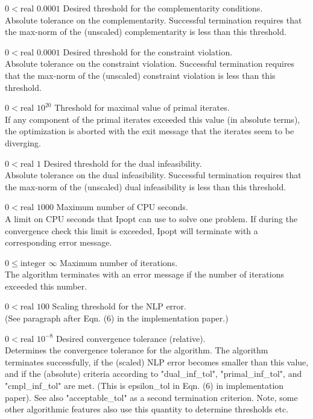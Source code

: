 %
{$0<\textrm{real}$}%
{$0.0001$}%
{Desired threshold for the complementarity conditions.\\
Absolute tolerance on the complementarity. Successful termination requires that the max-norm of the (unscaled) complementarity is less than this threshold.}%
{}

%
{$0<\textrm{real}$}%
{$0.0001$}%
{Desired threshold for the constraint violation.\\
Absolute tolerance on the constraint violation. Successful termination requires that the max-norm of the (unscaled) constraint violation is less than this threshold.}%
{}

%
{$0<\textrm{real}$}%
{$10^{ 20}$}%
{Threshold for maximal value of primal iterates.\\
If any component of the primal iterates exceeded this value (in absolute terms), the optimization is aborted with the exit message that the iterates seem to be diverging.}%
{}

%
{$0<\textrm{real}$}%
{$1$}%
{Desired threshold for the dual infeasibility.\\
Absolute tolerance on the dual infeasibility. Successful termination requires that the max-norm of the (unscaled) dual infeasibility is less than this threshold.}%
{}

%
{$0<\textrm{real}$}%
{$1000$}%
{Maximum number of CPU seconds.\\
A limit on CPU seconds that Ipopt can use to solve one problem.  If during the convergence check this limit is exceeded, Ipopt will terminate with a corresponding error message.}%
{}

%
{$0\leq\textrm{integer}$}%
{$\infty$}%
{Maximum number of iterations.\\
The algorithm terminates with an error message if the number of iterations exceeded this number.}%
{}

%
{$0<\textrm{real}$}%
{$100$}%
{Scaling threshold for the NLP error.\\
(See paragraph after Eqn. (6) in the implementation paper.)}%
{}

%
{$0<\textrm{real}$}%
{$10^{- 8}$}%
{Desired convergence tolerance (relative).\\
Determines the convergence tolerance for the algorithm.  The algorithm terminates successfully, if the (scaled) NLP error becomes smaller than this value, and if the (absolute) criteria according to "dual\_inf\_tol", "primal\_inf\_tol", and "cmpl\_inf\_tol" are met.  (This is epsilon\_tol in Eqn. (6) in implementation paper).  See also "acceptable\_tol" as a second termination criterion.  Note, some other algorithmic features also use this quantity to determine thresholds etc.}%
{}


